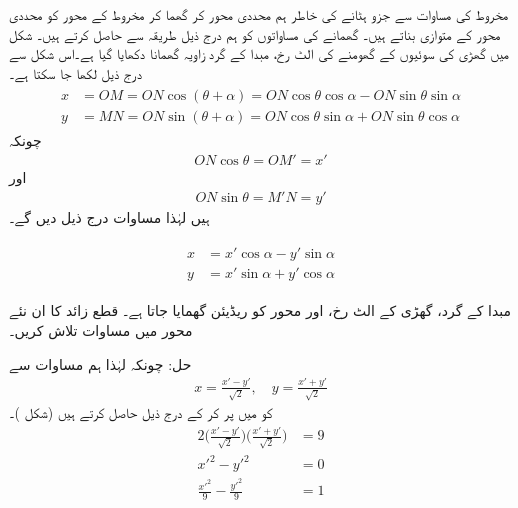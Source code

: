 مخروط کی مساوات سے جزو  ہٹانے کی خاطر ہم محددی محور کر گھما کر مخروط کے محور کو محددی محور کے متوازی بناتے ہیں۔ گھمانے کی مساواتوں کو ہم درج ذیل طریقہ سے حاصل کرتے ہیں۔ شکل  میں گھڑی کی سوئیوں کے گھومنے کی الٹ رخ، مبدا کے گرد زاویہ  گھمانا دکھایا گیا ہے۔اس شکل سے درج ذیل لکھا جا سکتا ہے۔
\begin{gather}
\begin{aligned}\label{مساوات_مخروط_گھمانا_الف}
x&=OM=ON\cos(\theta+\alpha)=ON\cos\theta\cos \alpha-ON\sin\theta\sin\alpha\\
y&=MN=ON\sin(\theta+\alpha)=ON\cos\theta\sin\alpha+ON\sin\theta\cos\alpha
\end{aligned}
\end{gather}
چونکہ 
\begin{align*}
ON\cos\theta=OM'=x'
\end{align*}
اور
\begin{align*}
ON\sin\theta=M'N=y'
\end{align*}
ہیں لہٰذا مساوات  درج ذیل دیں گے۔


\begin{gather}
\begin{aligned}\label{مساوات_مخروط_محور_کی_گھمائی}
x&=x'\cos \alpha-y'\sin\alpha\\
y&=x'\sin\alpha+y'\cos\alpha
\end{aligned}
\end{gather}


مبدا کے گرد، گھڑی کے الٹ رخ،  اور  محور کو  ریڈیئن گھمایا جاتا ہے۔ قطع زائد  کا ان نئے محور میں مساوات تلاش کریں۔  

حل:\quad
چونکہ  لہٰذا ہم مساوات  سے
\begin{align*}
x=\frac{x'-y'}{\sqrt{2}},\quad y=\frac{x'+y'}{\sqrt{2}}
\end{align*}
کو  میں پر کر کے درج ذیل حاصل کرتے ہیں (شکل )۔
\begin{align*}
2\big(\frac{x'-y'}{\sqrt{2}}\big)\big(\frac{x'+y'}{\sqrt{2}}\big)&=9\\
x'^2-y'^2&=0\\
\frac{x'^2}{9}-\frac{y'^2}{9}&=1
\end{align*}


